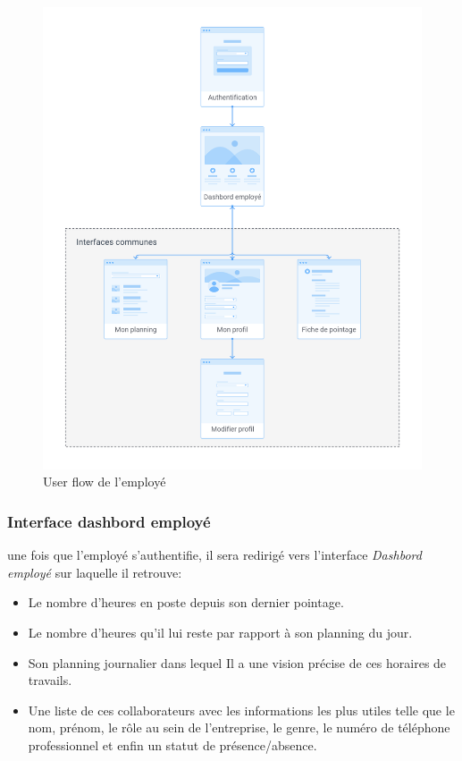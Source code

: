 \begin{figure}[h!]
    \vspace{-30pt}
    \centering
    \includegraphics[scale=0.38 ]{images/interface/Espace employe.png}
    \vspace{-20pt}
    \caption{User flow de l'employé}
    \label{fig91}
\end{figure} 

\clearpage

\subsubsection*{Interface dashbord employé}
une fois que l’employé s'authentifie, il sera redirigé vers l’interface
\emph{Dashbord employé} sur laquelle il retrouve:

\begin{itemize}
    \item[\textbullet] Le nombre d’heures en poste depuis son dernier pointage.
    \item[\textbullet] Le nombre d’heures qu’il lui reste par rapport à son
        planning du jour.
    \item[\textbullet] Son planning journalier dans lequel Il a une vision
        précise de ces horaires de travails.
    \item[\textbullet] Une liste de ces collaborateurs avec les informations les
        plus utiles telle que le nom, prénom, le rôle au sein de l’entreprise,
        le genre, le numéro de téléphone professionnel et enfin un statut de
        présence/absence.
\end{itemize}

